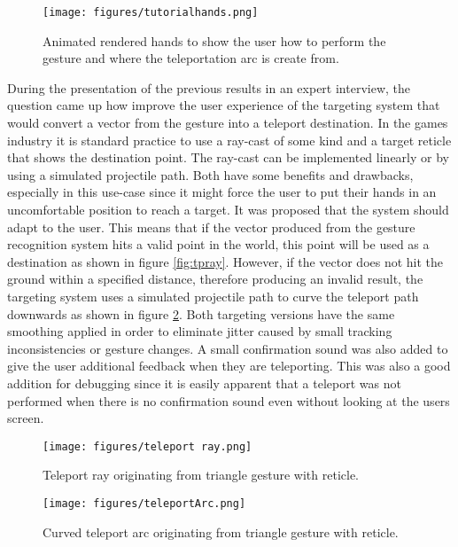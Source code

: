 \begin{figure}[!ht]
    \centering
    \texttt{[image: figures/tutorialhands.png]}
    \caption{Animated rendered hands to show the user how to perform the gesture and where the teleportation arc is create from.}
    \label{fig:tutorial}
\end{figure}

During the presentation of the previous results in an expert interview, the question came up how improve the user experience of the targeting system that would convert a vector from the gesture into a teleport destination. In the games industry it is standard practice to use a ray-cast of some kind and a target reticle that shows the destination point. The ray-cast can be implemented linearly or by using a simulated projectile path. Both have some benefits and drawbacks, especially in this use-case since it might force the user to put their hands in an uncomfortable position to reach a target. It was proposed that the system should adapt to the user. This means that if the vector produced from the gesture recognition system hits a valid point in the world, this point will be used as a destination as shown in figure \ref{fig:tpray}. However, if the vector does not hit the ground within a specified distance, therefore producing an invalid result, the targeting system uses a simulated projectile path to curve the teleport path downwards as shown in figure \ref{fig:tparc}. Both targeting versions have the same smoothing applied in order to eliminate jitter caused by small tracking inconsistencies or gesture changes. A small confirmation sound was also added to give the user additional feedback when they are teleporting. This was also a good addition for debugging since it is easily apparent that a teleport was not performed when there is no confirmation sound even without looking at the users screen.

\begin{figure}[!htb]
        \texttt{[image: figures/teleport ray.png]}
        \caption{Teleport ray originating from triangle gesture with reticle.}
        \label{fig:tpray}
    \endminipage\hfill
        \texttt{[image: figures/teleportArc.png]}
        \caption{Curved teleport arc originating from triangle gesture with reticle.}
        \label{fig:tparc}
    \endminipage\hfill
\end{figure}